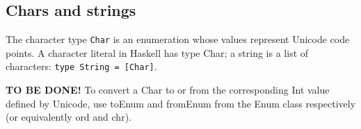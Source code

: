 %

\subsection{Chars and strings}
The character type \texttt{Char} is an enumeration whose values represent Unicode code points.
A character literal in Haskell has type Char; a string is a list of characters: \texttt{type String = [Char]}.

\textbf{TO BE DONE!}
To convert a Char to or from the corresponding Int value defined by Unicode, use toEnum and fromEnum from the Enum class respectively (or equivalently ord and chr).

%